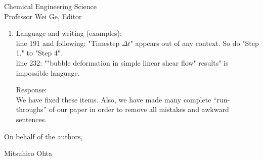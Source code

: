 \documentclass{letter}
\begin{document}
\begin{letter}{
Chemical Engineering Science\\
Professor Wei Ge, Editor\\}
\begin{enumerate}
Response: \\
We disagree that not including gravity ``obliterates'' the results.

At the least, there are a host of strictly microgravity applications in which our research will be of great help.   We list many new applications, including the microgravity applications, in the revised version: please see the first paragraph in the introduction.  All these applications that we list will significantly benefit from our article.  

We have also added a discussion at the end of section 2 (see the ``Remark'') in which we make some predictions as to how the inclusion of gravity would change the results.

Having said that, we do agree that taking into account the gravity effects and initial condition effects will make good material for future work.  Please see the last paragraph in our modified conclusion.  \\

\par\noindent
\item
\textsf
{Language and writing (examples):\\
line 191 and following: "Timestep $\Delta t$" appears out of any context. So do "Step 1." to "Step 4".\\
line 232: ""bubble deformation in simple linear shear flow" results" is impossible language. \\}
\vspace{3 mm}

Response: \\
We have fixed these items.  Also, we have made many complete ``run-throughs'' of our paper in order to remove all mistakes and awkward sentences.

\end{enumerate}

\closing{On behalf of the authors,}
Mitsuhiro Ohta

\end{letter}
\end{document}
